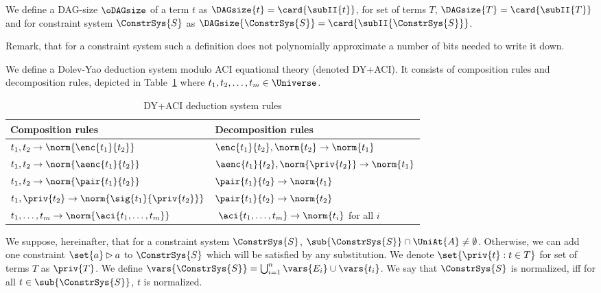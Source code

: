 \begin{df}\label{df:sizedag}
    We define a DAG-size $\oDAGsize$ of a term $t$ as
\( \DAGsize{t} = \card{\subII{t}}\),
for set of terms $T$,
\( \DAGsize{T} = \card{\subII{T}}\)
and for constraint system $\ConstrSys{S}$ as
\( \DAGsize{\ConstrSys{S}} = \card{\subII{\ConstrSys{S}}}\).
\end{df}
Remark, that for a constraint system such a definition does not polynomially approximate a number of bits needed to write it down.








We define a Dolev-Yao deduction system modulo ACI equational theory  (denoted DY+ACI). 
It consists of composition rules and decomposition rules, depicted in Table~\ref{tab:DYACI} 
where $t_1, t_2, \dots, t_m \in \Universe$.

\begin{table}[ht]
\centering
\begin{tabular}{|l|l|}
\hline
Composition rules & Decomposition rules \\
\hline
 $ {t_1, t_2} \rightarrow \norm{\enc{t_1}{t_2}}$ & ${\enc{t_1}{t_2},  \norm{t_2}} \rightarrow \norm{t_1}$ \\
$ {t_1, t_2} \rightarrow \norm{\aenc{t_1}{t_2}}$ &  ${\aenc{t_1}{t_2},  \norm{\priv{t_2}}} \rightarrow \norm{t_1}$\\
$ {t_1, t_2} \rightarrow \norm{\pair{t_1}{t_2}}$ & $ {\pair{t_1}{t_2}} \rightarrow \norm{t_1}$\\
$ {t_1, \priv{t_2}} \rightarrow \norm{\sig{t_1}{\priv{t_2}}}$ & ${\pair{t_1}{t_2}} \rightarrow \norm{t_2}$\\ 
$ {t_1, \dots, t_m} \rightarrow \norm{\aci{{t_1, \dots, t_m}}}$ & $\  \aci{{t_1, \dots, t_m}} \rightarrow \norm{t_i}$ for all $i$ \\
\hline
\end{tabular}
\caption{DY+ACI deduction system rules}\label{tab:DYACI}
\end{table}






We suppose, hereinafter,  that for a constraint system $\ConstrSys{S}$,  $\sub{\ConstrSys{S}} \cap \UniAt{A} \neq \emptyset$. Otherwise, we can add one constraint $\set{a} \rhd a$ to $\ConstrSys{S}$ which will be satisfied by any substitution.
We denote $\set{\priv{t}:t\in T}$ for set of terms $T$ as $\priv{T}$.
We define $\vars{\ConstrSys{S}} = \bigcup_{i=1}^n \vars{E_i} \cup \vars{t_i}$.
We say that $\ConstrSys{S}$ is normalized, iff for all $t\in \sub{\ConstrSys{S}}$, $t$ is normalized. 

